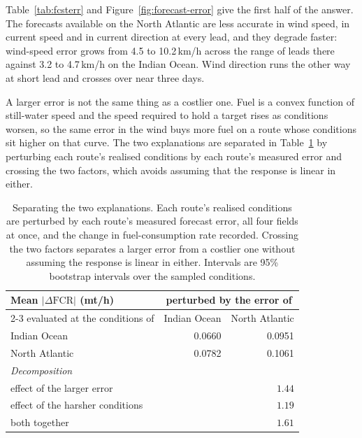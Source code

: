 \documentclass[review,authoryear]{elsarticle}
\begin{document}
Table~\ref{tab:fcsterr} and Figure~\ref{fig:forecast-error} give the first half of the answer. The
forecasts available on the North Atlantic are less accurate in wind speed, in current speed and in
current direction at every lead, and they degrade faster: wind-speed error grows from 4.5 to
10.2\,km/h across the range of leads there against 3.2 to 4.7\,km/h on the Indian Ocean. Wind
direction runs the other way at short lead and crosses over near three days.

A larger error is not the same thing as a costlier one. Fuel is a convex function of still-water
speed and the speed required to hold a target rises as conditions worsen, so the same error in the
wind buys more fuel on a route whose conditions sit higher on that curve. The two explanations are
separated in Table~\ref{tab:fcstfac} by perturbing each route's realised conditions by each route's
measured error and crossing the two factors, which avoids assuming that the response is linear in
either.

\begin{table}[ht]
\centering
\caption{Separating the two explanations. Each route's realised conditions are
perturbed by each route's measured forecast error, all four fields at once, and the
change in fuel-consumption rate recorded. Crossing the two factors separates a larger
error from a costlier one without assuming the response is linear in either. Intervals
are 95\% bootstrap intervals over the sampled conditions.}
\label{tab:fcstfac}
\begin{tabular}{lrr}
\toprule
Mean $|\Delta\mathrm{FCR}|$ (mt/h) & \multicolumn{2}{c}{perturbed by the error of} \\
\cmidrule(lr){2-3}
evaluated at the conditions of & Indian Ocean & North Atlantic \\
\midrule
Indian Ocean & 0.0660 & 0.0951 \\
North Atlantic & 0.0782 & 0.1061 \\
\midrule
\multicolumn{3}{l}{\emph{Decomposition}} \\
\quad effect of the larger error & \multicolumn{2}{r}{$1.44$ \; [$1.31$, $1.56$]} \\
\quad effect of the harsher conditions & \multicolumn{2}{r}{$1.19$ \; [$1.07$, $1.29$]} \\
\quad both together & \multicolumn{2}{r}{$1.61$ \; [$1.46$, $1.75$]} \\
\bottomrule
\end{tabular}
\end{table}
\end{document}

